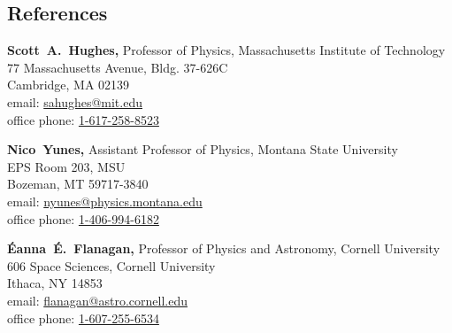 \documentclass[margin,line]{res}
\begin{document}
\begin{resume}
\section{\sc References}
\vspace*{.05in}
\parbox{\textwidth}{%
{\bf Scott~A.~Hughes,} Professor of Physics, Massachusetts Institute of Technology \\
77 Massachusetts Avenue, Bldg. 37-626C \\
Cambridge, MA 02139 \\
email: \href{mailto:sahughes@mit.edu}{sahughes@mit.edu} \\
office phone: \href{tel:1-617-258-8523}{1-617-258-8523}}
\par
\parbox{\textwidth}{%
{\bf Nico~Yunes,} Assistant Professor of Physics, Montana State University\\
EPS Room 203, MSU\\
Bozeman, MT 59717-3840\\
email: \href{mailto:nyunes@physics.montana.edu}{nyunes@physics.montana.edu} \\
office phone: \href{tel:1-406-994-6182}{1-406-994-6182}}
\par
\parbox{\textwidth}{%
{\bf {\'E}anna~{\'E}.~Flanagan,} Professor of Physics and Astronomy,
Cornell University\\
606 Space Sciences, Cornell University\\
Ithaca, NY 14853\\
email: \href{mailto:flanagan@astro.cornell.edu}{flanagan@astro.cornell.edu}\\
office phone: \href{tel:1-607-255-6534}{1-607-255-6534}}

\end{resume}
\end{document}
